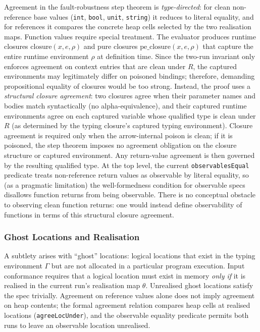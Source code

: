 \documentclass[12pt]{article}
\begin{document}
Agreement in the fault-robustness step theorem is \emph{type-directed}: for clean
non-reference base values (\texttt{int}, \texttt{bool}, \texttt{unit}, \texttt{string}) it reduces
to literal equality, and for references it compares the concrete heap cells
selected by the two realisation maps. Function values require special treatment.
The evaluator produces runtime closures $\text{closure}(x,e,\rho)$ and pure
closures $\text{pe\_closure}(x,e,\rho)$ that capture the entire runtime
environment $\rho$ at definition time. Since the two-run invariant only enforces
agreement on context entries that are clean under $R$, the captured environments
may legitimately differ on poisoned bindings; therefore, demanding propositional
equality of closures would be too strong.
Instead, the proof uses a \emph{structural closure agreement}: two closures agree
when their parameter names and bodies match syntactically (no alpha-equivalence),
and their captured runtime environments agree on each captured variable whose
qualified type is clean under $R$ (as determined by the typing closure's captured
typing environment).
Closure agreement is required only when the arrow-internal poison is clean; if
it is poisoned, the step theorem imposes no agreement obligation on the closure
structure or captured environment. Any return-value agreement is then governed
by the resulting qualified type.
At the top level, the current \texttt{observablesEqual} predicate treats
non-reference return values as observable by literal equality, so (as a pragmatic
limitation) the well-formedness condition for observable specs disallows function
returns from being observable. There is no conceptual obstacle to observing clean
function returns: one would instead define observability of functions in terms of
this structural closure agreement.

\subsubsection*{Ghost Locations and Realisation}

A subtlety arises with ``ghost'' locations: logical locations that exist in the
typing environment $\Gamma$ but are not allocated in a particular program
execution. Input conformance requires that a logical location must exist in memory \emph{only if} it is
realised in the current run's realisation map $\theta$. Unrealised ghost
locations satisfy the spec trivially. Agreement on reference values alone does
not imply agreement on heap contents; the formal agreement relation compares heap
cells at realised locations (\texttt{agreeLocUnder}), and the observable equality
predicate permits both runs to leave an observable location unrealised.
\end{document}
